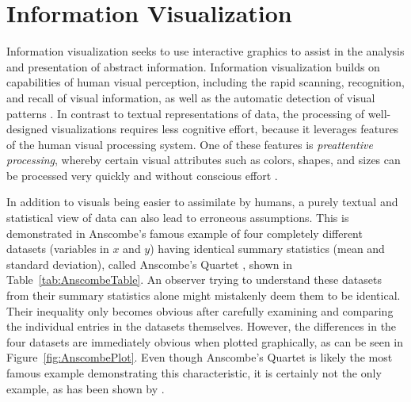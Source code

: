 
\chapter{Information Visualization}
\label{chap:InfoVis}

Information visualization seeks to use interactive graphics to assist
in the analysis and presentation of abstract information. Information
visualization builds on capabilities of human visual perception,
including the rapid scanning, recognition, and recall of visual
information, as well as the automatic detection of visual patterns
\parencite{Ware-InfoVis-Perception-4Ed}. In contrast to textual
representations of data, the processing of well-designed
visualizations requires less cognitive effort, because it leverages
features of the human visual processing system.  One of these features
is \emph{preattentive processing}, whereby certain visual attributes
such as colors, shapes, and sizes can be processed very quickly and
without conscious effort \parencite{PreattentiveProcessing}.


In addition to visuals being easier to assimilate by humans, a purely
textual and statistical view of data can also lead to erroneous
assumptions. This is demonstrated in Anscombe's famous example of four
completely different datasets (variables in $x$ and $y$) having
identical summary statistics (mean and standard deviation), called
Anscombe's Quartet \parencite{AnscombesQuartet}, shown in
Table~\ref{tab:AnscombeTable}. An observer trying to understand these
datasets from their summary statistics alone might mistakenly deem
them to be identical. Their inequality only becomes obvious after
carefully examining and comparing the individual entries in the
datasets themselves.
%
However, the differences in the four datasets are immediately obvious
when plotted graphically, as can be seen in
Figure~\ref{fig:AnscombePlot}. Even though Anscombe's Quartet is
likely the most famous example demonstrating this characteristic, it
is certainly not the only example, as has been shown by
\textcite{GenDataIdenticalStatisticsDissimilarGraphics}.



